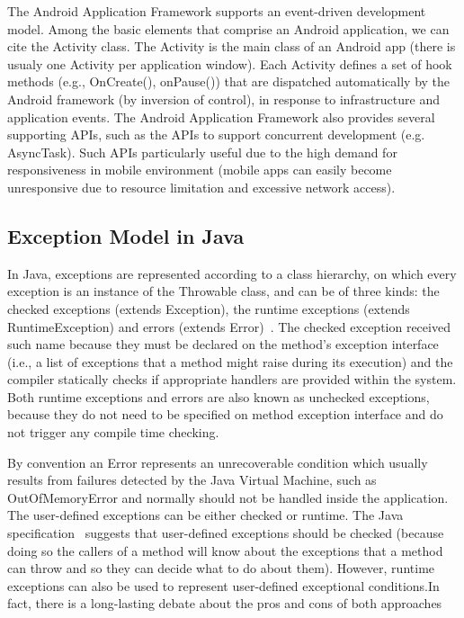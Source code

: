 \documentclass[conference]{IEEEtran}
\begin{document}
The Android Application Framework supports an event-driven development model. 
Among the basic elements that comprise an Android application, we can cite the
 Activity class. The Activity is the main class of an Android app (there is usualy one
Activity per application window). Each Activity defines a set of hook methods  
(e.g., OnCreate(), onPause()) that are dispatched automatically by the Android 
framework (by inversion of control), in response to infrastructure and application events.
The Android Application Framework also provides several supporting APIs, such as 
the APIs to support concurrent development (e.g. AsyncTask). 
Such APIs particularly useful due to the high demand for responsiveness 
in mobile environment (mobile apps can easily become 
unresponsive due to resource limitation and excessive network access).



\subsection{Exception Model in Java} \label{sec:extypes}

In Java, exceptions are represented according to a class hierarchy, on which
 every exception is an instance of the Throwable class, and can be of three kinds: the checked exceptions
(extends Exception), the runtime exceptions (extends RuntimeException) and errors
(extends Error)~\cite{gosling2000java}. The checked exception received such name
 because they must be declared on the method's exception interface (i.e., a list of exceptions that a method 
might raise during its execution) and the compiler statically checks if
 appropriate handlers are provided within the system.
Both runtime exceptions and errors are also known as unchecked exceptions, because 
they do not need to be specified on method exception interface and do not trigger any 
compile time checking.

By convention an Error represents an unrecoverable condition which usually results
from failures detected by the Java Virtual Machine, such as OutOfMemoryError and
normally should not be handled inside the application. The user-defined exceptions 
can be either checked or runtime. The Java specification~\cite{gosling2000java} 
suggests that user-defined exceptions should be checked (because doing so 
the callers of a method will know about the exceptions that a method can throw and so 
they can decide what to do about them). However, runtime exceptions can also be 
used to represent user-defined exceptional conditions.In fact, there is a long-lasting debate 
about the pros and cons of both approaches~\cite{javatut,stackoverlow,debate}
\end{document}
